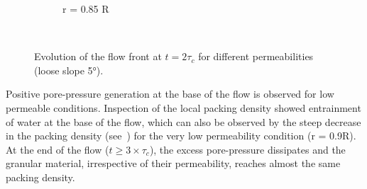 \begin{figure}
{\begin{subfigure}[b]{0.95\textwidth}
    \caption{r = 0.85 R}
    \label{fig:LBM_660_Slope5_r085}
\end{subfigure}
}\\
\caption{Evolution of the flow front at $t = 2\tau_c$ for different 
permeabilities (loose slope 5\si{\degree}).}
\label{fig:slope_loose_5}
\end{figure}

Positive pore-pressure generation at the base of the flow is observed for low 
permeable conditions. Inspection of the local packing density showed 
entrainment of water at the base of the flow, which can also be observed by the 
steep decrease in the packing density (see~) for the very low 
permeability condition (r = 0.9R). At the end of the flow ($t \ge 3 \times 
\tau_c$), the excess pore-pressure dissipates and the granular material, 
irrespective of their permeability, reaches almost the same packing density.



